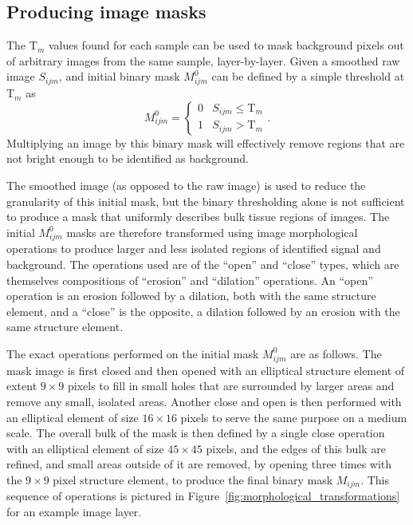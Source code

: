 \documentclass[letterpaper,11pt]{article}
\newcommand{\reffig}[1]{Figure~\ref{#1}}
\newcommand{\Tau}{\mathrm{T}}
\begin{document}
\subsection{Producing image masks}
\label{ssec:producing_image_masks}

The $\Tau_{m}$ values found for each sample can be used to mask background pixels out of arbitrary images from the same sample, layer-by-layer. Given a smoothed raw image $S_{ijm}$, and initial binary mask $M^{0}_{ijm}$ can be defined by a simple threshold at $\Tau_{m}$ as
\begin{equation}
M^{0}_{ijm} = 
\begin{cases} 
      0 & S_{ijm} \leq \Tau_{m} \\
      1 & S_{ijm} > \Tau_{m} 
\end{cases}
 .
\end{equation}
Multiplying an image by this binary mask will effectively remove regions that are not bright enough to be identified as background.

The smoothed image (as opposed to the raw image) is used to reduce the granularity of this initial mask, but the binary thresholding alone is not sufficient to produce a mask that uniformly describes bulk tissue regions of images. The initial $M^{0}_{ijm}$ masks are therefore transformed using image morphological operations \cite{opencv_mt} to produce larger and less isolated regions of identified signal and background. The operations used are of the ``open'' and ``close'' types, which are themselves compositions of ``erosion'' and ``dilation'' operations. An ``open'' operation is an erosion followed by a dilation, both with the same structure element, and a ``close'' is the opposite, a dilation followed by an erosion with the same structure element.

The exact operations performed on the initial mask $M^{0}_{ijm}$ are as follows. The mask image is first closed and then opened with an elliptical structure element of extent $9 \times 9$ pixels to fill in small holes that are surrounded by larger areas and remove any small, isolated areas. Another close and open is then performed with an elliptical element of size $16 \times 16$ pixels to serve the same purpose on a medium scale. The overall bulk of the mask is then defined by a single close operation with an elliptical element of size $45 \times 45$ pixels, and the edges of this bulk are refined, and small areas outside of it are removed, by opening three times with the $9 \times 9$ pixel structure element, to produce the final binary mask $M_{ijm}$. This sequence of operations is pictured in \reffig{fig:morphological_transformations} for an example image layer. 
\end{document}
